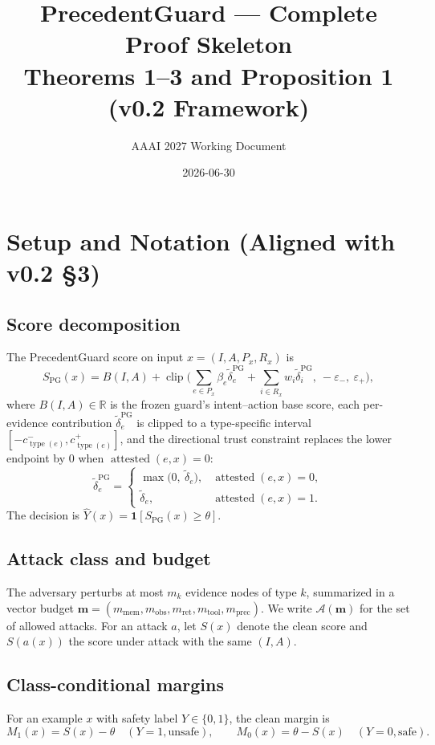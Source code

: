 \documentclass[11pt]{article}
\title{PrecedentGuard --- Complete Proof Skeleton\\
       \large Theorems 1--3 and Proposition 1 (v0.2 Framework)}
\author{AAAI 2027 Working Document}
\date{2026-06-30}
\theoremstyle{plain}
\theoremstyle{definition}
\DeclareMathOperator{\clip}{clip}
\DeclareMathOperator{\attested}{attested}
\DeclareMathOperator{\type}{type}
\begin{document}
\maketitle

\section{Setup and Notation (Aligned with v0.2 \S 3)}

\subsection{Score decomposition}

The PrecedentGuard score on input $x = (I, A, P_x, R_x)$ is
\[
S_{\mathrm{PG}}(x) = B(I, A) + \clip\!\Big(\sum_{e \in P_x} \beta_e \tilde\delta_e^{\mathrm{PG}}
        + \sum_{i \in R_x} w_i \tilde\delta_i^{\mathrm{PG}},\ -\varepsilon_-,\ \varepsilon_+ \Big),
\]
where $B(I, A) \in \mathbb{R}$ is the frozen guard's intent--action base score,
each per-evidence contribution $\tilde\delta_e^{\mathrm{PG}}$ is clipped to a type-specific interval $[-c_{\type(e)}^-, c_{\type(e)}^+]$,
and the directional trust constraint replaces the lower endpoint by $0$ when $\attested(e, x) = 0$:
\[
\tilde\delta_e^{\mathrm{PG}} =
\begin{cases}
\max\!\bigl(0,\ \tilde\delta_e\bigr), & \attested(e,x) = 0,\\[2pt]
\tilde\delta_e, & \attested(e,x) = 1.
\end{cases}
\]
The decision is $\hat Y(x) = \mathbf{1}[S_{\mathrm{PG}}(x) \ge \theta]$.

\subsection{Attack class and budget}

The adversary perturbs at most $m_k$ evidence nodes of type $k$, summarized in a vector budget
$\mathbf m = (m_{\mathrm{mem}}, m_{\mathrm{obs}}, m_{\mathrm{ret}}, m_{\mathrm{tool}}, m_{\mathrm{prec}})$.
We write $\mathcal A(\mathbf m)$ for the set of allowed attacks.
For an attack $a$, let $S(x)$ denote the clean score and $S(a(x))$ the score under attack
with the same $(I, A)$.

\subsection{Class-conditional margins}

For an example $x$ with safety label $Y \in \{0, 1\}$, the clean margin is
\[
M_1(x) = S(x) - \theta \quad (Y = 1, \text{unsafe}),
\qquad
M_0(x) = \theta - S(x) \quad (Y = 0, \text{safe}).
\]
\end{document}
